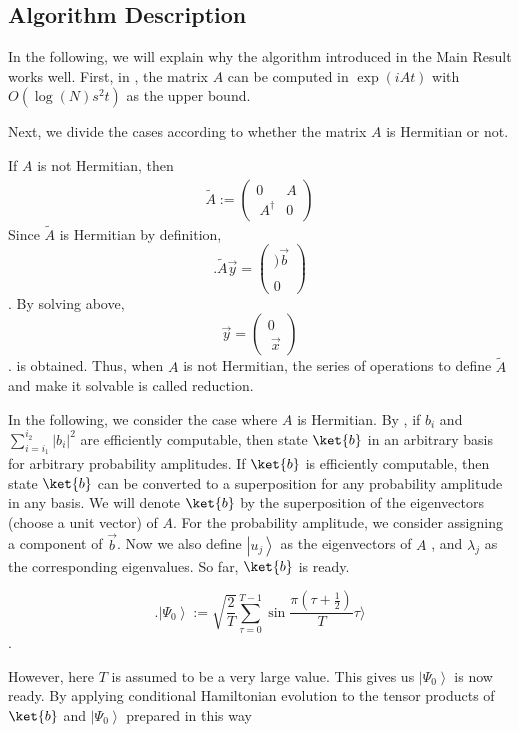 \documentclass[b5paper,papersize,dvipdfmx,fleqn]{jsarticle}
\begin{document}
\subsection{Algorithm Description}

In the following, we will explain why the algorithm introduced in the Main Result works well. First, in \cite{Berry2007}, the matrix $A$ can be computed in $\exp(iAt)$ with $O(\log(N)s^2t)$ as the upper bound.

Next, we divide the cases according to whether the matrix $A$ is Hermitian or not.

If $A$ is not Hermitian, then
\begin{eqnarray}
  \tilde{A}:= \left(\begin{array}{cc}
0 & A \\\
A^{\dagger} & 0
\end{array}\right)
\end{eqnarray}
Since $\tilde{A}$ is Hermitian by definition,
$$.
\tilde{A} \vec{y}=\left(\begin{array}{l})
\vec{b}\\\\
0
\end{array}\right)
$$.
By solving above,
$$
\vec{y}=\left(\begin{array}{l}
0 \\\
\vec{x}
\end{array}\right)
$$.
is obtained. Thus, when $A$ is not Hermitian, the series of operations to define $\tilde{A}$ and make it solvable is called reduction.

In the following, we consider the case where $A$ is Hermitian. By \cite{Grover2002}, if $b_{i}$ and $\sum_{i=i_{1}}^{i_{2}}\left|b_{i}\right|^{2}$ are efficiently computable, then state $\ket{b}$ in an arbitrary basis for arbitrary probability amplitudes. If $\ket{b}$ is efficiently computable, then state $\ket{b}$ can be converted to a superposition for any probability amplitude in any basis. We will denote $\ket{b}$ by the superposition of the eigenvectors (choose a unit vector) of $A$. For the probability amplitude, we consider assigning a component of $\vec{b}$. Now we also define $\left|u_{j}\right\rangle$ as the eigenvectors of $A$ , and $\lambda_{j}$ as the corresponding eigenvalues. So far, $\ket{b}$ is ready.

$$.
\left|\Psi_{0}\right\rangle:=\sqrt{\frac{2}{T}}\sum_{\tau=0}^{T-1}\sin \frac{\pi\left(\tau+\frac{1}{2}\right)}{T}\tau\rangle
$$.

However, here $T$ is assumed to be a very large value. This gives us $\left|\Psi_{0}\right\rangle$ is now ready. By applying conditional Hamiltonian evolution to the tensor products of $\ket{b}$ and $\left|\Psi_{0}\right\rangle$ prepared in this way
\end{document}
